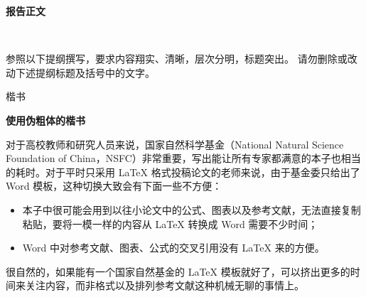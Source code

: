 \documentclass[a4paper,cs4size]{article}
\let\kaishu\relax %
\newcommand{\xiaosihao}{\fontsize{12pt}{\baselineskip}\selectfont}    %
\begin{document}
\xiaosihao
\setlength{\abovedisplayskip}{0pt}
\setlength{\belowdisplayskip}{0pt}

\begin{center}
  {\kaishu {} \textbf{报告正文} \vspace{-3ex}}
\end{center}  

\thispagestyle{empty} 　　　%

{\kaishu {}  参照以下提纲撰写，要求内容翔实、清晰，层次分明，标题突出。} \alert {请勿删除或改动下述提纲标题及括号中的文字。\vspace{9bp}}







{\kaishu 楷书}

{\bfseries\kaishu 使用伪粗体的楷书}




对于高校教师和研究人员来说，国家自然科学基金（National Natural Science Foundation of China，NSFC）非常重要，写出能让所有专家都满意的本子也相当的耗时。对于平时只采用 LaTeX 格式投稿论文的老师来说，由于基金委只给出了 Word 模板，这种切换大致会有下面一些不方便：
\begin{itemize}
  \item 本子中很可能会用到以往小论文中的公式、图表以及参考文献，无法直接复制粘贴，要将一模一样的内容从 LaTeX 转换成 Word 需要不少时间；
  \item Word 中对参考文献、图表、公式的交叉引用没有 LaTeX 来的方便。
\end{itemize}
很自然的，如果能有一个国家自然基金的 LaTeX 模板就好了，可以挤出更多的时间来关注内容，而非格式以及排列参考文献这种机械无聊的事情上。
\end{document}
